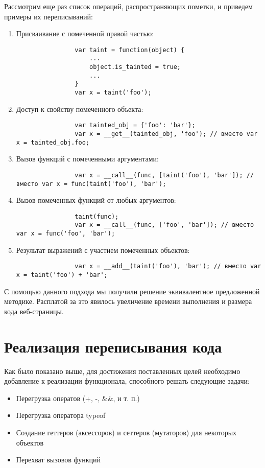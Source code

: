 	Рассмотрим еще раз список операций, распространяющих пометки, и приведем примеры их переписываний:
	\bigskip
	\begin{enumerate}
		\item Присваивание с помеченной правой частью:
			\begin{lstlisting}
				var taint = function(object) {
					...
					object.is_tainted = true;
					...
				}
				var x = taint('foo');
			\end{lstlisting}
		\item Доступ к свойству помеченного объекта: 
			\begin{lstlisting}
				var tainted_obj = {'foo': 'bar'}; 
				var x = __get__(tainted_obj, 'foo'); // вместо var x = tainted_obj.foo; 
			\end{lstlisting}
		\item Вызов функций с помеченными аргументами:
			\begin{lstlisting}
				var x = __call__(func, [taint('foo'), 'bar']); // вместо var x = func(taint('foo'), 'bar');
			\end{lstlisting}
		\item Вызов помеченных функций от любых аргументов:
			\begin{lstlisting}
				taint(func);
				var x = __call__(func, ['foo', 'bar']); // вместо var x = func('foo', 'bar');
			\end{lstlisting}
		\item Результат выражений с участием помеченных объектов:
			\begin{lstlisting}
				var x = __add__(taint('foo'), 'bar'); // вместо var x = taint('foo') + 'bar';
			\end{lstlisting}
	\end{enumerate}

	С помощью данного подхода мы получили решение эквивалентное предложенной методике. Расплатой за это явилось увеличение времени выполнения и размера кода веб-страницы.

\section{Реализация переписывания кода}
Как было показано выше, для достижения поставленных целей необходимо добавление к реализации функционала, способного решать следующие задачи:

\begin{itemize}
	\item Перегрузка оператов (+, -, \&\&, и т. п.)
	\item Перегрузка оператора typeof
	\item Создание геттеров (аксессоров) и сеттеров (мутаторов) для некоторых объектов
	\item Перехват вызовов функций
\end{itemize}



